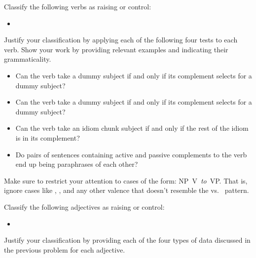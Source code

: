 \documentclass[a4paper,landscape,headrule,footrule]{foils}
\begin{document}
\noindent Classify the following verbs as raising or control:

\begin{itemize}
\item {}
\end{itemize}

\noindent
Justify your classification by applying each of the following four
tests to each verb.  Show your work by providing relevant examples
and indicating their grammaticality. 

\begin{itemize}
\item[(i)] Can the verb take a  dummy  subject if and only if its complement selects for a dummy  subject?

\item[(ii)] Can the verb take a dummy  subject if and only if
  its complement selects for a dummy  subject?

\item[(iii)] Can the verb take an idiom chunk subject if and only
if the rest of the idiom is in its complement?

\item[(iv)] Do pairs of sentences containing active and 
passive complements to the verb end up being  paraphrases 
of each other?
\end{itemize}

\noindent
Make sure to restrict your attention to cases of the form: \hbox{NP V
  {\it to} VP}. That is, ignore cases like ,
, and any other valence that doesn't resemble
the  vs.\  pattern.
\normalsize

Classify the following adjectives as raising or 
control:

\begin{itemize}
\item {}
\end{itemize}

\noindent
Justify your classification by providing each of the four types
of data discussed in the previous problem for each adjective.
\end{document}
